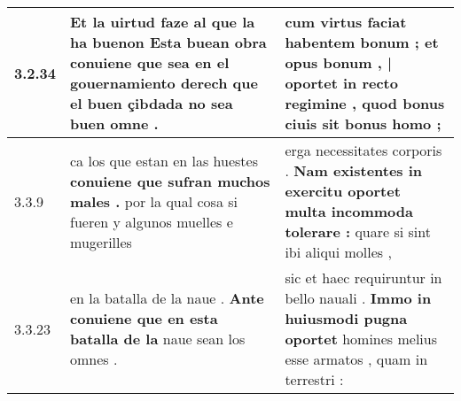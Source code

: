 \begin{tabular}{|p{1cm}|p{6.5cm}|p{6.5cm}|}
3.2.34 & Et la uirtud faze al que la ha buenon \textbf{ Esta buean obra conuiene que sea en el gouernamiento derech } que el buen çibdada no sea buen omne . & cum virtus faciat habentem bonum ; \textbf{ et opus bonum , | oportet in recto regimine , } quod bonus ciuis sit bonus homo ; \\\hline
3.3.9 & ca los que estan en las huestes \textbf{ conuiene que sufran muchos males . } por la qual cosa si fueren y algunos muelles e mugerilles & erga necessitates corporis . \textbf{ Nam existentes in exercitu oportet multa incommoda tolerare : } quare si sint ibi aliqui molles , \\\hline
3.3.23 & en la batalla de la naue . \textbf{ Ante conuiene que en esta batalla de la } naue sean los omnes . & sic et haec requiruntur in bello nauali . \textbf{ Immo in huiusmodi pugna oportet } homines melius esse armatos , quam in terrestri : \\\hline

\end{tabular}
